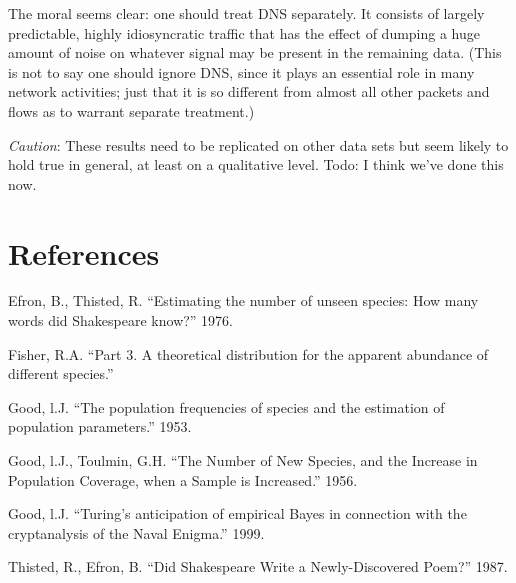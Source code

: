 \documentclass{paper}
\begin{document}
The moral seems clear: one should treat DNS separately. It consists of largely
predictable, highly idiosyncratic traffic that has the effect of dumping a huge
amount of noise on whatever signal may be present in the remaining data. (This
is not to say one should ignore DNS, since it plays an essential role in many
network activities; just that it is so different from almost all other packets
and flows as to warrant separate treatment.)

\emph{Caution}: These results need to be replicated on other data sets but seem
likely to hold true in general, at least on a qualitative level. Todo: I think
we've done this now.

\section{References}
Efron, B., Thisted, R. ``Estimating the number of unseen species: How many
words did Shakespeare know?'' 1976.

Fisher, R.A. ``Part 3. A theoretical distribution for the apparent abundance of
different species.''

Good, l.J. ``The population frequencies of species and the estimation of
population parameters.'' 1953.

Good, l.J., Toulmin, G.H. ``The Number of New Species, and the Increase in
Population Coverage, when a Sample is Increased.'' 1956.

Good, l.J. ``Turing's anticipation of empirical Bayes in connection with the
cryptanalysis of the Naval Enigma.'' 1999.

Thisted, R., Efron, B. ``Did Shakespeare Write a Newly-Discovered Poem?'' 1987.
\end{document}
